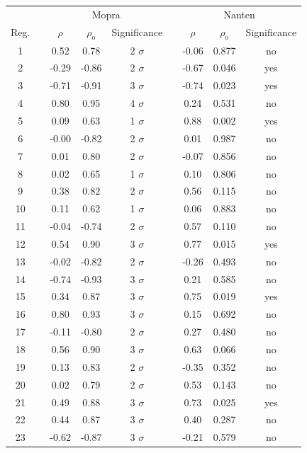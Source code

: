 \documentclass[12pt,a4paper]{article}
\begin{document}
\begin{table}[H] 
	\centering
	\begin{tabular}{ccccccccc}
		\toprule 
		&&
		\multicolumn{3}{c}{Mopra} 
		&&
		\multicolumn{3}{c}{Nanten} \\
		\cline{2-5} \cline{7-9} 
		Reg. && $\rho$ & $\rho_\mathrm{o}$ & Significance && $\rho$ & $\rho_\mathrm{o}$ & Significance \\
		\hline 
		1 && 0.52 & 0.78 & 2 $\sigma$ && -0.06 & 0.877 & no \\
		2 && -0.29 & -0.86 & 2 $\sigma$ && -0.67 & 0.046 & yes \\
		3 && -0.71 & -0.91 & 3 $\sigma$ && -0.74 & 0.023 & yes \\
		4 && 0.80 & 0.95 & 4 $\sigma$ && 0.24 & 0.531 & no \\
		5 && 0.09 & 0.63 & 1 $\sigma$ && 0.88 & 0.002 & yes \\
		6 && -0.00 & -0.82 & 2 $\sigma$ && 0.01 & 0.987 & no \\ 
		7 && 0.01 & 0.80 & 2 $\sigma$ && -0.07 & 0.856 & no \\
		8 && 0.02 & 0.65 & 1 $\sigma$ && 0.10 & 0.806 & no \\
		9 && 0.38 & 0.82 & 2 $\sigma$ && 0.56 & 0.115 & no \\
		10 && 0.11 & 0.62 & 1 $\sigma$ && 0.06 & 0.883 & no \\
		11 && -0.04 & -0.74 & 2 $\sigma$ && 0.57 & 0.110 & no \\
		12 && 0.54 & 0.90 & 3 $\sigma$ && 0.77 & 0.015 & yes \\
		13 && -0.02 & -0.82 & 2 $\sigma$ && -0.26 & 0.493 & no \\
		14 && -0.74 & -0.93 & 3 $\sigma$ && 0.21 & 0.585 & no \\
		15 && 0.34 & 0.87 & 3 $\sigma$ && 0.75 & 0.019 & yes \\
		16 && 0.80 & 0.93 & 3 $\sigma$ && 0.15 & 0.692 & no \\ 
		17 && -0.11 & -0.80 & 2 $\sigma$ && 0.27 & 0.480 & no \\
		18 && 0.56 & 0.90 & 3 $\sigma$ && 0.63 & 0.066 & no \\
		19 && 0.13 & 0.83 & 2 $\sigma$ && -0.35 & 0.352 & no \\
		20 && 0.02 & 0.79 & 2 $\sigma$ && 0.53 & 0.143 & no \\
		21 && 0.49 & 0.88 & 3 $\sigma$ && 0.73 & 0.025 & yes \\
		22 && 0.44 & 0.87 & 3 $\sigma$ && 0.40 & 0.287 & no \\
		23 && -0.62 & -0.87 & 3 $\sigma$ && -0.21 & 0.579 & no \\

\end{tabular}
\end{table}
\end{document}
